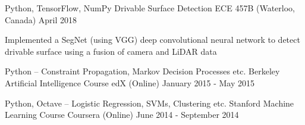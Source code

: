 \vspace{-1.0mm}
\vspace{-3mm}
\begin{center}
  \cventry
    {Python, TensorFlow, NumPy}
    {Drivable Surface Detection}
    {ECE 457B (Waterloo, Canada)}
    {April 2018}
    {
      \begin{cvitems}
      \item {Implemented a SegNet (using VGG) deep convolutional neural network to detect drivable surface using a fusion of camera and LiDAR data}
      \end{cvitems}
    }
\end{center}
\begin{center}
  \vspace{-3.2mm}
  \cventry
    {Python – Constraint Propagation, Markov Decision Processes etc.}
    {Berkeley Artificial Intelligence Course}
    {edX (Online)}
    {January 2015 - May 2015}
    {}
\end{center}
\begin{center}
  \vspace{-6.2mm}
  \cventry
    {Python, Octave – Logistic Regression, SVMs, Clustering etc.}
    {Stanford Machine Learning Course}
    {Coursera (Online)}
    {June 2014 - September 2014}
    {}
\end{center}
